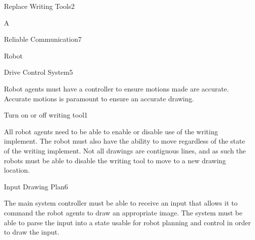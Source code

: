 \begin{functional_requirement}{Replace Writing Tools}{2}
\label{fr:replace_tool}
\item A
\end{functional_requirement}

\begin{functional_requirement}{Reliable Communication}{7}
\label{fr:reliable_comm}
\item Robot
\end{functional_requirement}

\begin{functional_requirement}{Drive Control System}{5}
\label{fr:drive_control}
\item Robot agents must have a controller to ensure motions made are accurate. Accurate motions is paramount to ensure an accurate drawing.  
\end{functional_requirement}

\begin{functional_requirement}{Turn on or off writing tool}{1}
\label{fr:on_tool}
\item All robot agents need to be able to enable or disable use of the writing implement. The robot must also have the ability to move regardless of the state of the writing implement. Not all drawings are contiguous lines, and as such the robots must be able to disable the writing tool to move to a new drawing location.
\end{functional_requirement}

\begin{functional_requirement}{Input Drawing Plan}{6}
\label{fr:input_plan}
\item The main system controller must be able to receive an input that allows it to command the robot agents to draw an appropriate image. The system must be able to parse the input into a state usable for robot planning and control in order to draw the input. 
\end{functional_requirement}

